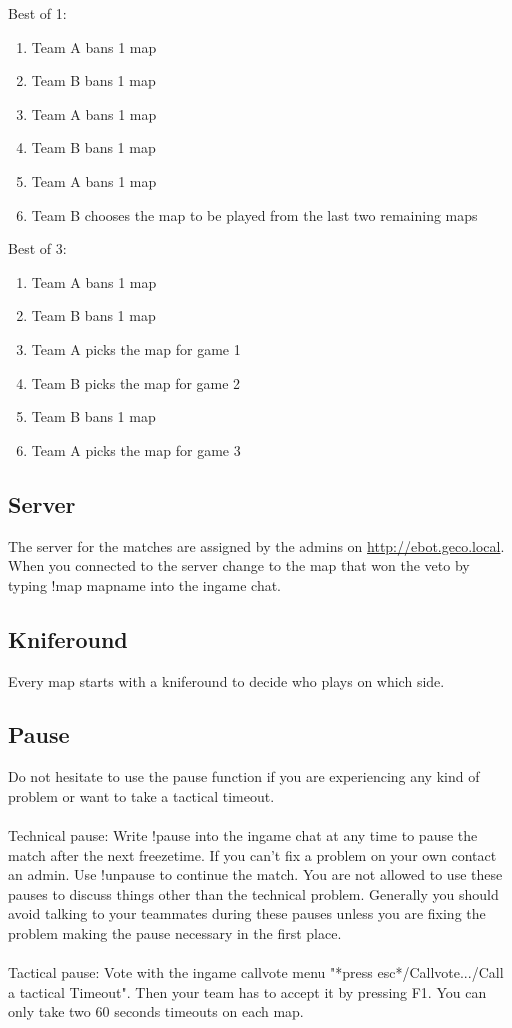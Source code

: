 \documentclass{article}
\begin{document}
Best of 1:
\begin{enumerate}
\item Team A bans 1 map
\item Team B bans 1 map
\item Team A bans 1 map
\item Team B bans 1 map
\item Team A bans 1 map
\item Team B chooses the map to be played from the last two remaining maps
\end{enumerate}

Best of 3:
\begin{enumerate}
\item Team A bans 1 map
\item Team B bans 1 map
\item Team A picks the map for game 1
\item Team B picks the map for game 2
\item Team B bans 1 map
\item Team A picks the map for game 3
\end{enumerate}

\subsection{Server}
The server for the matches are assigned by the admins on \url{http://ebot.geco.local}.\\
When you connected to the server change to the map that won the veto by typing {\selectfont 
!map mapname} into the ingame chat.

\subsection{Kniferound}
Every map starts with a kniferound to decide who plays on which side.


\subsection{Pause}
\label{sec:pause}
Do not hesitate to use the pause function if you are experiencing any kind of problem or want to take a tactical timeout.\\
\\Technical pause: Write {\selectfont 
!pause}  into the ingame chat at any time to pause the match after the next freezetime. If you can't fix a problem on your own contact an admin. Use {\selectfont 
!unpause} to continue the match. You are not allowed to use these pauses to discuss things other than the technical problem. Generally you should avoid talking to your teammates during these pauses unless you are fixing the problem making the pause necessary in the first place.\\
\\Tactical pause: Vote with the ingame callvote menu "*press esc*/Callvote.../Call a tactical Timeout". Then your team has to accept it by pressing F1. You can only take two 60 seconds timeouts on each map.
\end{document}

